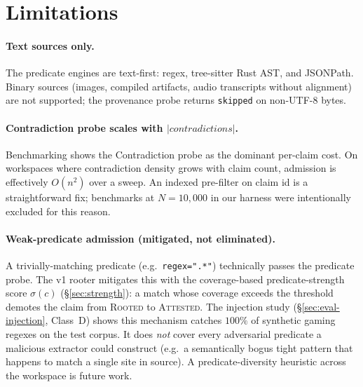 \documentclass[10pt,a4paper]{article}
\begin{document}
\section{Limitations}
\label{sec:limitations}

\paragraph{Text sources only.}
The predicate engines are text-first: regex, tree-sitter Rust AST, and
JSONPath. Binary sources (images, compiled artifacts, audio transcripts
without alignment) are not supported; the provenance probe returns
\texttt{skipped} on non-UTF-8 bytes.

\paragraph{Contradiction probe scales with $|contradictions|$.}
Benchmarking shows the Contradiction probe as the dominant per-claim cost.
On workspaces where contradiction density grows with claim count, admission
is effectively $O(n^2)$ over a sweep. An indexed pre-filter on claim id is
a straightforward fix; benchmarks at $N=10{,}000$ in our harness were
intentionally excluded for this reason.

\paragraph{Weak-predicate admission (mitigated, not eliminated).}
A trivially-matching predicate (e.g.\ \texttt{regex=".*"}) technically
passes the predicate probe. The v1 rooter mitigates this with the
coverage-based predicate-strength score $\sigma(c)$
(§\ref{sec:strength}): a match whose coverage exceeds the threshold
demotes the claim from \textsc{Rooted} to \textsc{Attested}. The
injection study (§\ref{sec:eval-injection}, Class~D) shows this
mechanism catches $100\%$ of synthetic gaming regexes on the test
corpus. It does \emph{not} cover every adversarial predicate a
malicious extractor could construct (e.g.\ a semantically bogus tight
pattern that happens to match a single site in source). A
predicate-diversity heuristic across the workspace is future work.
\end{document}
